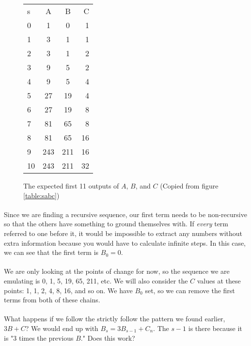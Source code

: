 \documentclass[12pt,letterpaper]{article}
\begin{document}
			\begin{figure*}[h]
				\centering
				\begin{tabular}{l | c | c | r}
					s & A & B & C \\
					0 & 1 & 0 & 1 \\
					1 & 3 & 1 & 1 \\
					2 & 3 & 1 & 2 \\
					3 & 9 & 5 & 2 \\
					4 & 9 & 5 & 4 \\
					5 & 27 & 19 & 4 \\
					6 & 27 & 19 & 8 \\
					7 & 81 & 65 & 8 \\
					8 & 81 & 65 & 16 \\
					9 & 243 & 211 & 16 \\
					10 & 243 & 211 & 32 \\
				\end{tabular}
				
				\captionsetup{list=no,format=hang}
				\caption*{The expected first 11 outputs of $A$, $B$, and $C$ (Copied from figure \ref{table:sabc})}
			\end{figure*}
		
			\paragraph{} Since we are finding a recursive sequence, our first term needs to be non-recursive so that the others have something to ground themselves with. If \textit{every} term referred to one before it, it would be impossible to extract any numbers without extra information because you would have to calculate infinite steps. In this case, we can see that the first term is $B_0 = 0$.
			
			\paragraph{} We are only looking at the points of change for now, so the sequence we are emulating is 0, 1, 5, 19, 65, 211, etc. We will also consider the $C$ values at these points: 1, 1, 2, 4, 8, 16, and so on. We have $B_0$ set, so we can remove the first terms from both of these chains. 
			
			\paragraph{} What happens if we follow the strictly follow the pattern we found earlier, $3B + C$? We would end up with $B_s = 3B_{s-1} + C_n$. The $s-1$ is there because it is "3 times the previous $B$." Does this work?
			
\end{document}
